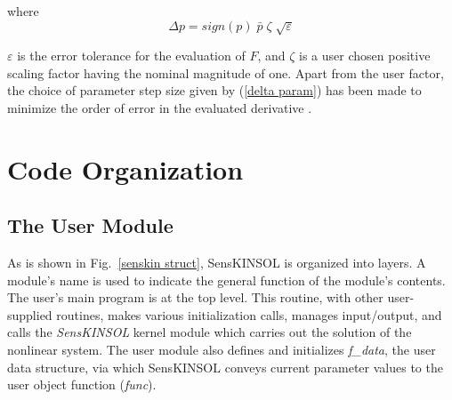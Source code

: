 \documentclass[11pt]{article}
\begin{document}
\bigskip
where
\begin{equation}
\Delta p = sign(p)\;\bar p\;\zeta \;\sqrt \varepsilon \label{delta param}
\end{equation}
\smallskip

$\varepsilon$ is the error tolerance for the evaluation of $F$, and
$\zeta$ is a user chosen positive scaling factor having the nominal
magnitude of one. Apart from the user factor, the choice of parameter
step size given by (\ref{delta param}) has been made to minimize the
order of error in the evaluated derivative \cite[pp. 79-80]{Kelley95}.


\section{Code Organization}
\subsection{The User Module}

As is shown in \mbox{Fig. \ref{senskin struct}}, SensKINSOL is
organized into layers. A module's name is used to indicate the general
function of the module's contents. The user's main program is at the
top level. This routine, with other user-supplied routines, makes
various initialization calls, manages input/output, and calls the {\em
SensKINSOL} kernel module which carries out the solution of the
nonlinear system. The user module also defines and initializes {\em
f\_data}, the user data structure, via which SensKINSOL conveys current
parameter values to the user object function ({\em func}).
\end{document}
